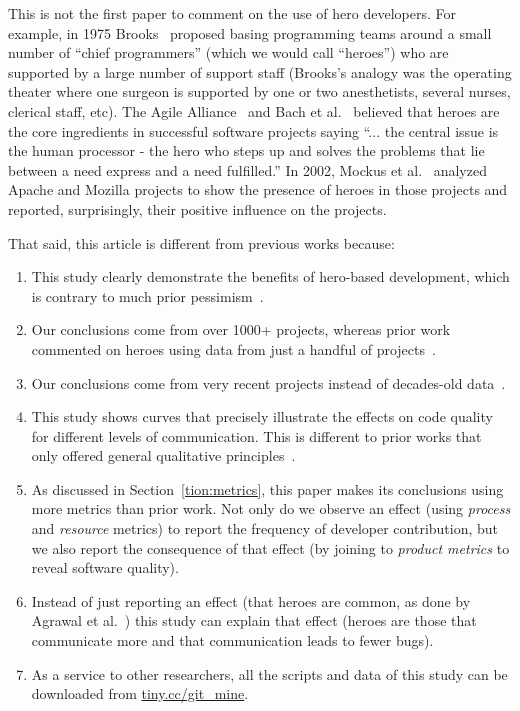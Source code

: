 \documentclass[smallextended]{svjour3}
\newcommand{\be}{\begin{enumerate}}
\newcommand{\ee}{\end{enumerate}}
\begin{document}
This is not the first paper to comment on the use of hero developers. 
For example,
in 1975  Brooks~\cite{Brooks:1975} proposed
basing programming teams around a small number of ``chief programmers'' (which we would call ``heroes'')  who are supported by a large number of support staff
(Brooks's analogy was the operating theater where one surgeon is supported by one or two anesthetists, several nurses,
clerical staff, etc). 
The Agile Alliance~\cite{cockburn2006agile} and Bach et al.~\cite{bach1995enough} believed that heroes are the core ingredients in successful software projects saying ``... the central issue is the human processor - the hero  who steps up and solves the problems that lie between a need express and a need fulfilled.'' 
In 2002, Mockus et al.~\cite{mockus2002two} analyzed Apache and Mozilla projects to show the presence of heroes in those projects and reported, surprisingly,  their positive influence on the projects. 
  

That said, this article is different from previous works because:

\be
\item
This study clearly demonstrate the benefits of hero-based development, which is contrary to much prior pessimism~\cite{bier2011online,boehm2006view,hislop2002integrating,morcovcomplex,wood2005multiview,fitzgerald2003making}.
\item
Our conclusions come from   over 1000+ projects, whereas 
prior work   commented
on heroes using data 
from just a handful of projects~\cite{544352,LI1993111,Zimmermann:2009:CDP:1595696.1595713,935855,841025,Bird:2011:DTM:2025113.2025119,Pamela,bell2,Kumar2017,jiarpakdee2018impact,8595100}.
\item
Our conclusions come from very recent projects instead of decades-old data~\cite{Jayanthi2018,Gupta2017,jiarpakdee2018impact,kemerer2009impact,Pamela,fengzhang}.
\item
This study shows curves that precisely illustrate the effects on code quality
for different levels of communication. This is different to prior
works that only offered general qualitative principles~\cite{wolf2009predicting,de2004sometimes,grinter1999geography,herbsleb1999splitting,cataldo2013coordination,cataldo2007coordination}.
\item
As discussed in Section~\ref{tion:metrics}, this
paper makes its conclusions using more metrics
than  prior work.   Not only do we observe an effect (using
{\em process} and {\em resource} metrics) to report the  frequency of
developer contribution, but we also report the consequence of that effect
(by joining to {\em product metrics} to reveal software quality).
\item
Instead of just  reporting an effect (that heroes are common, as done by
 Agrawal et al.~\cite{Agrawal_2018}) this study can explain that effect
 (heroes are those that communicate more and that communication
 leads to fewer bugs).
\item
As a service to other researchers, all  the  scripts and data of this study
can be downloaded from \href{http://tiny.cc/git_mine}{tiny.cc/git\_mine}.
\ee
\end{document}
